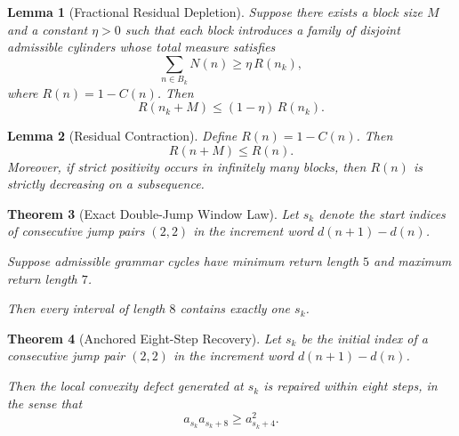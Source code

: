 \documentclass[12pt, oneside]{article}
\numberwithin{equation}{section}
\theoremstyle{definition}
\theoremstyle{plain}
\newtheorem{theorem}{Theorem}[section]
\newtheorem{lemma}[theorem]{Lemma}
\theoremstyle{remark}
\begin{document}


\begin{lemma}[Fractional Residual Depletion]
\label{lem:fractional-depletion}
Suppose there exists a block size $M$ and a constant $\eta > 0$ such that
each block introduces a family of disjoint admissible cylinders whose
total measure satisfies
\[
\sum_{n \in B_k} N(n) \ge \eta \, R(n_k),
\]
where $R(n) = 1 - C(n)$.
Then
\[
R(n_k + M) \le (1 - \eta)\,R(n_k).
\]
\end{lemma}

\begin{lemma}[Residual Contraction]
\label{lem:residual-contraction}
Define $R(n) = 1 - C(n)$. Then
\[
R(n+M) \le R(n).
\]
Moreover, if strict positivity occurs in infinitely many blocks,
then $R(n)$ is strictly decreasing on a subsequence.
\end{lemma}


\begin{theorem}[Exact Double-Jump Window Law]
Let $s_k$ denote the start indices of consecutive jump pairs
$(2,2)$ in the increment word $d(n+1)-d(n)$.

Suppose admissible grammar cycles have minimum return length $5$
and maximum return length $7$.

Then every interval of length $8$ contains exactly one $s_k$.
\end{theorem}

\begin{theorem}[Anchored Eight-Step Recovery]
Let $s_k$ be the initial index of a consecutive jump pair $(2,2)$
in the increment word $d(n+1)-d(n)$.

Then the local convexity defect generated at $s_k$
is repaired within eight steps, in the sense that
\[
a_{s_k}a_{s_k+8}\ge a_{s_k+4}^2.
\]
\end{theorem}

\end{document}
